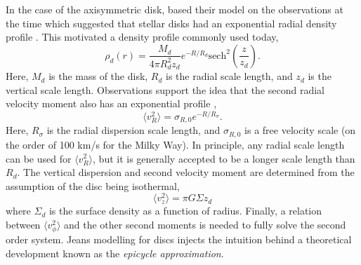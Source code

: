 In the case of the axisymmetric disk, \citet{hernquist_1993} based their model on the observations at the time which suggested that stellar disks had an exponential radial density profile \citep{freeman_1970}. This motivated a density profile commonly used today,
\begin{equation}
\rho_d(r) = \frac{M_d}{4 \pi R_d^2 z_d} e^{-R/R_d} \text{sech}^2\left(\frac{z}{z_d} \right). 
\end{equation}
Here, $M_d$ is the mass of the disk, $R_d$ is the radial scale length, and $z_d$ is the vertical scale length.
Observations support the idea that the second radial velocity moment also has an exponential profile \citep{van_der_kruit_searle_1981, lewis_freeman_1989},
\begin{equation}
\langle v_R^2 \rangle = \sigma_{R,0} e^{-R/R_\sigma}.
\end{equation}
Here, $R_\sigma$ is the radial dispersion scale length, and $\sigma_{R,0}$ is a free velocity scale (on the order of 100 km/s for the Milky Way). In  principle, any radial scale length can be used for $\langle v_R^2 \rangle$, but it is generally accepted to be a longer scale length than $R_d$. The vertical dispersion and second velocity moment are determined from the assumption of the disc being isothermal,
\begin{equation}
\langle v_z^2 \rangle = \pi G \Sigma z_d
\end{equation}
where $\Sigma_d$ is the surface density as a function of radius. Finally, a relation between $\langle v_\phi^2 \rangle$ and the other second moments is needed to fully solve the second order system. Jeans modelling for discs injects the intuition behind a theoretical development known as the \textit{epicycle approximation}. 

